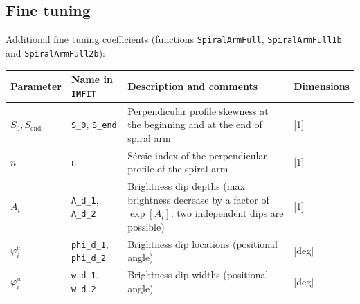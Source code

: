 \documentclass[12pt,a4paper]{article}
\begin{document}
\begin{table}[h]
\subsection{Fine tuning}
	Additional fine tuning coefficients (functions \verb*|SpiralArmFull|, \verb*|SpiralArmFull1b| and \verb*|SpiralArmFull2b|):\\
	\begin{tabularx}{\textwidth}{|L{0.6}|L{0.6}|L{1.8}|l|}
		\hline
		Parameter & Name in \verb*|IMFIT| & Description and comments & Dimensions \\
		\hline
		$S_0, S_\text{end}$ & \verb*|S_0|, \verb*|S_end| & Perpendicular profile skewness at the beginning and at the end of spiral arm & [1] \\
		\hline
		$n$ & \verb*|n| &  S{\'e}rsic index of the perpendicular profile of the spiral arm & [1] \\
		\hline
		$A_i$ & \verb*|A_d_1|, \verb*|A_d_2| & Brightness dip depths (max brightness decrease by a factor of $\exp[A_i]$; two independent dips are possible) & [1] \\
		\hline
		$\varphi^c_i$ & \verb*|phi_d_1|, \verb*|phi_d_2| & Brightness dip locations (positional angle) & [deg] \\
		\hline
		$\varphi^w_i$ & \verb*|w_d_1|, \verb*|w_d_2| & Brightness dip widths (positional angle) & [deg] \\
		\hline
	\end{tabularx}
\end{table}
\end{document}
